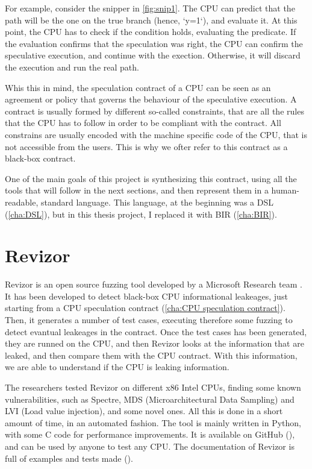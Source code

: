 For example, consider the snipper in \ref{fig:snip1}. The CPU can predict that
the path will be the one on the true branch (hence, `y=1`), and evaluate it. At this
point, the CPU has to check if the condition holds, evaluating the predicate. If
the evaluation confirms that the speculation was right, the CPU can confirm the speculative
execution, and continue with the exection. Otherwise, it will discard the
execution and run the real path.

Whis this in mind, the speculation contract of a CPU can be seen as an agreement
or policy that governs the behaviour of the speculative execution. A contract is
usually formed by different so-called constraints, that are all the rules that the
CPU has to follow in order to be compliant with the contract. All constrains are
usually encoded with the machine specific code of the CPU, that is not accessible
from the users. This is why we ofter refer to this contract as a black-box
contract.

One of the main goals of this project is synthesizing this contract, using all the
tools that will follow in the next sections, and then represent them in a human-readable,
standard language. This language, at the beginning was a DSL (\ref{cha:DSL}),
but in this thesis project, I replaced it with BIR (\ref{cha:BIR}).

\section{Revizor}
\label{cha:Revizor} Revizor is an open source fuzzing tool developed by a Microsoft
Research team \cite{article}. It has been developed to detect black-box CPU
informational leakeages, just starting from a CPU speculation contract (\ref{cha:CPU
speculation contract}). Then, it generates a number of test cases, executing
therefore some fuzzing to detect evantual leakeages in the contract. Once the test
cases has been generated, they are runned on the CPU, and then Revizor looks at the
information that are leaked, and then compare them with the CPU contract. With this
information, we are able to understand if the CPU is leaking information.

The researchers tested Revizor on different x86 Intel CPUs, finding some known vulnerabilities,
such as Spectre, MDS (Microarchitectural Data Sampling) and LVI (Load value
injection), and some novel ones. All this is done in a short amount of time, in
an automated fashion. The tool is mainly written in Python, with some C code for
performance improvements. It is available on GitHub (\cite{repo}), and can be
used by anyone to test any CPU. The documentation of Revizor is full of examples
and tests made (\cite{misc}).


